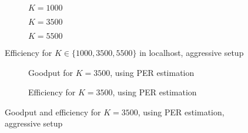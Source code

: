 \begin{figure}[t!]
\centering
\begin{subfigure}{0.23\textwidth}
	\captionsetup{justification=centering,font=scriptsize}
	\centering
	\setlength\fwidth{\textwidth}
	\setlength{}
	
	\caption{$K=1000$}
	\label{fig:lh_eff_1000}
\end{subfigure}\hspace{2em}%
\begin{subfigure}{0.23\textwidth}
	\captionsetup{justification=centering,font=scriptsize}
	\centering
	\setlength\fwidth{\textwidth}
	\setlength{}
	
	\caption{$K=3500$}
	\label{fig:lh_eff_3500}
\end{subfigure}\hspace{2em}%
\begin{subfigure}{0.23\textwidth}
	\captionsetup{justification=centering,font=scriptsize}
	\centering
	\setlength\fwidth{\textwidth}
	\setlength{}
	
	\caption{$K=5500$}
	\label{fig:lh_eff_5500}
\end{subfigure}
\caption{Efficiency for $K \in \{1000, 3500, 5500\}$ in localhost, aggressive setup}
\label{fig:efficiency_aggr}
\end{figure}

\begin{figure}[t!]
\centering
\begin{subfigure}{0.23\textwidth}
	\captionsetup{justification=centering,font=scriptsize}
	\setlength\fwidth{\textwidth}
	\setlength{}
	
	\caption{Goodput for $K=3500$, using PER estimation}
	\label{fig:pm1_goodput}
\end{subfigure}\hspace{2em}%
\begin{subfigure}{0.23\textwidth}
	\captionsetup{justification=centering,font=scriptsize}
	\setlength\fwidth{\textwidth}
	\setlength{}
	
	\caption{Efficiency for $K=3500$, using PER estimation}
	\label{fig:pm1_efficiency}
\end{subfigure}
\caption{Goodput and efficiency for $K=3500$, using PER estimation, aggressive setup}
\label{fig:pm1}
\end{figure}

